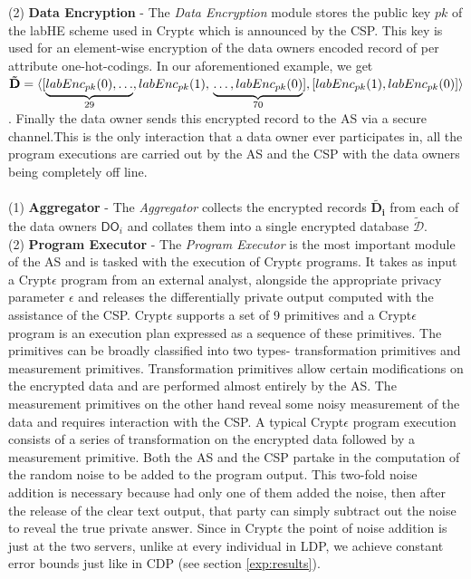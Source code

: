 (2)\textbf{ Data Encryption} - The \textit{Data Encryption} module stores the public key $pk$ of the labHE scheme used in Crypt$\epsilon$ which is announced by the CSP. This key is used for an element-wise encryption of the data owners encoded record of per attribute one-hot-codings. In our aforementioned example, we get $\mathbf{\tilde{D}}=\langle[\underbrace{labEnc_{pk}(0),\ldots}_{29},labEnc_{pk}(1),\\\underbrace{\ldots,labEnc_{pk}(0)}_{70}],
[labEnc_{pk}(1),labEnc_{pk}(0)]\rangle$. Finally the data owner sends this encrypted record to the \textsf{AS} via a secure channel.This is the only interaction that a data owner ever participates in, all the program executions are carried out by the \textsf{AS} and the \textsf{CSP} with the data owners being completely off line.\\
\\
(1)\textbf{  Aggregator} - The \textit{Aggregator} collects the encrypted records $\mathbf{\tilde{D_i}}$ from each of the data owners $\textsf{DO}_i$ and collates them into a single encrypted database $\boldsymbol{\tilde{\mathcal{D}}}$. %
\\(2)\textbf{ Program Executor }- The \textit{Program Executor} is the most important module of the \textsf{AS} and is tasked with the execution of Crypt$\epsilon$ programs. It takes as input a Crypt$\epsilon$ program from an external analyst, alongside the appropriate privacy parameter $\epsilon$ and releases the differentially private output computed with the assistance of the \textsf{CSP}. Crypt$\epsilon$ supports a set of 9 primitives and a Crypt$\epsilon$ program is an execution plan expressed as a sequence of these primitives. The primitives can be broadly classified into two types- transformation primitives and measurement primitives. Transformation primitives allow certain modifications on the encrypted data and are performed almost entirely by the \textsf{AS}. The measurement primitives on the other hand reveal some noisy measurement of the data and requires interaction with the \textsf{CSP}. A typical Crypt$\epsilon$ program execution consists of  a series of transformation on the encrypted data followed by a measurement primitive. Both the \textsf{AS} and the \textsf{CSP} partake in the computation of the random noise to be added to the program output. This two-fold noise addition is necessary because had only one of them added the noise, then after the release of the clear text output, that party can simply subtract out the noise to reveal the true private answer. Since in Crypt$\epsilon$ the point of noise addition is just at the two servers, unlike at every individual in \textsf{LDP}, we achieve constant error bounds just like in \textsf{CDP} (see section \ref{exp:results}). 

